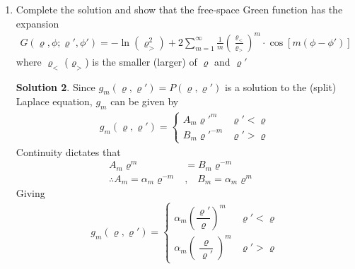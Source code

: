 \documentclass[letter,12pt]{article}
\theoremstyle{definition}
\newtheorem*{sol}{Solution}
\begin{document}
\begin{enumerate}
\begin{enumerate}
\begin{sol}
\begin{align*}
                \end{align*}
                Showing that the expansion is correct.
            \end{sol}
            \item
                Complete the solution and show that the free-space Green function has the expansion
                \begin{align*}
                    G(\varrho, \phi; \varrho', \phi') =
                    - \ln (\varrho_>^2) +
                    2 \sum_{m = 1}^{\infty} \frac{1}{m} {\left( \frac{\varrho_<}{\varrho_>} \right)}^m
                    \cdot \cos \left[ m (\phi - \phi') \right]
                \end{align*}
                where $\varrho_<$ ($\varrho_>$) is the smaller (larger)
                of $\varrho$ and $\varrho'$
                \begin{sol}
                    Since $g_m(\varrho, \varrho') = P(\varrho,
                    \varrho')$ is a solution to the (split) Laplace
                    equation, $g_m$ can be given by
                    \begin{align*}
                        g_m(\varrho, \varrho') =
                        \begin{cases}
                            A_m \varrho'^m & \varrho' < \varrho
                            \\
                            B_m \varrho'^{-m} & \varrho' > \varrho
                        \end{cases}
                    \end{align*}
                    Continuity dictates that
                    \begin{align*}
                        A_m \varrho^m &= B_m \varrho^{-m} &
                        \\
                        \therefore A_m = \alpha_m \varrho^{-m}
                        &,\;\;\;
                        B_m = \alpha_m \varrho^m &
                    \end{align*}
                    Giving
                    \begin{align*}
                        g_m(\varrho, \varrho') =
                        \begin{cases}
                            \alpha_m {\left(\dfrac{\varrho'}{\varrho}\right)}^m & \varrho' < \varrho
                            \\
                            \alpha_m {\left(\dfrac{\varrho}{\varrho'}\right)}^m & \varrho' > \varrho

\end{cases}
\end{align*}
\end{sol}
\end{enumerate}
\end{enumerate}
\end{document}
